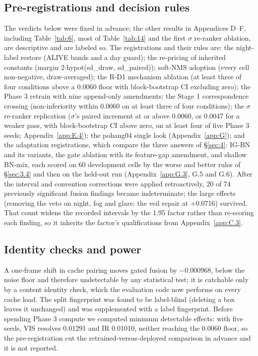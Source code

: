 \documentclass[10pt]{article}
\begin{document}
\subsection{Pre-registrations and decision rules}\label{app:C.6}
The verdicts below were fixed in advance; the other results in Appendices D--F, including Table~\ref{tab:6}, most of Table~\ref{tab:14} and the first $\sigma$ re-ranker ablation, are descriptive and are labeled so. The registrations and their rules are: the night-label restore (ALIVE bands and a day guard); the re-pricing of inherited constants (margin 2$\cdot$hypot(sd\_draw, sd\_paired)); soft-NMS \citep{bodla2017softnms} adoption (every cell non-negative, draw-averaged); the R-D1 mechanism ablation (at least three of four conditions above a 0.0060 floor with block-bootstrap CI excluding zero); the Phase 3 retrain with nine append-only amendments; the Stage 1 correspondence crossing (non-inferiority within 0.0060 on at least three of four conditions); the $\sigma$ re-ranker replication ($\sigma$'s paired increment at or above 0.0060, or 0.0047 for a weaker pass, with block-bootstrap CI above zero, on at least four of five Phase 3 seeds; Appendix~\ref{app:E.4}); the pohang04 single look (Appendix~\ref{app:G}); and the adaptation registrations, which compare the three answers of \S\ref{sec:4}: IG-BN and its variants, the gate ablation with its feature-gap amendment, and shallow BN-mix, each scored on 60 development cells by the worse and better rules of \S\ref{sec:3.4} and then on the held-out run (Appendix~\ref{app:G.3}, G.5 and G.6). After the interval and convention corrections were applied retroactively, 20 of 74 previously significant fusion findings became indeterminate; the large effects (removing the veto on night, fog and glare; the veil repair at +0.0716) survived. That count widens the recorded intervals by the 1.95 factor rather than re-scoring each finding, so it inherits the factor's qualifications from Appendix~\ref{app:C.3}.

\subsection{Identity checks and power}\label{app:C.7}
A one-frame shift in cache pairing moves gated fusion by $-$0.000968, below the noise floor and therefore undetectable by any statistical test; it is catchable only by a content identity check, which the evaluation code now performs on every cache load. The split fingerprint was found to be label-blind (deleting a box leaves it unchanged) and was supplemented with a label fingerprint. Before spending Phase 3 compute we computed minimum detectable effects: with five seeds, VIS resolves 0.01291 and IR 0.01010, neither reaching the 0.0060 floor, so the pre-registration cut the retrained-versus-deployed comparison in advance and it is not reported.
\end{document}
